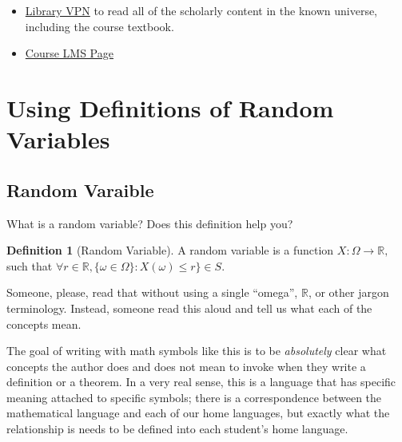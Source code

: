 \documentclass[
]{book}
\providecommand{\tightlist}{%
  \setlength{\itemsep}{0pt}\setlength{\parskip}{0pt}}
\theoremstyle{definition}
\newtheorem{definition}{Definition}[chapter]
\theoremstyle{definition}
\theoremstyle{definition}
\theoremstyle{definition}
\theoremstyle{remark}
\begin{document}
\begin{itemize}
\tightlist
\item
  \href{https://www.lib.berkeley.edu/using-the-libraries/vpn}{Library VPN} to read all of the scholarly content in the known universe, including the course textbook.
\item
  \href{https://www.bcourses.berkeley.edu}{Course LMS Page}
\end{itemize}

\hypertarget{using-definitions-of-random-variables}{%
\section{Using Definitions of Random Variables}\label{using-definitions-of-random-variables}}

\hypertarget{random-varaible}{%
\subsection{Random Varaible}\label{random-varaible}}

What is a random variable? Does this definition help you?

\begin{definition}[Random Variable]
A random variable is a function \(X : \Omega \rightarrow \mathbb{R},\) such that \(\forall r \in \mathbb{R}, \{\omega \in \Omega\}: X(\omega) \leq r\} \in S\).
\end{definition}

Someone, please, read that without using a single ``omega'', \(\mathbb{R}\), or other jargon terminology. Instead, someone read this aloud and tell us what each of the concepts mean.

The goal of writing with math symbols like this is to be \emph{absolutely} clear what concepts the author does and does not mean to invoke when they write a definition or a theorem. In a very real sense, this is a language that has specific meaning attached to specific symbols; there is a correspondence between the mathematical language and each of our home languages, but exactly what the relationship is needs to be defined into each student's home language.
\end{document}
